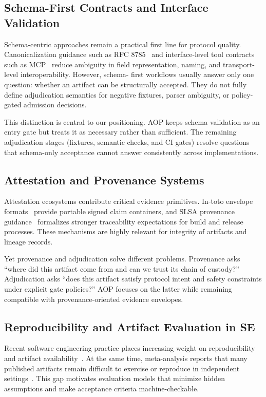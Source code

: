 \documentclass[10pt,conference]{IEEEtran}
\begin{document}
\subsection{Schema-First Contracts and Interface Validation}

Schema-centric approaches remain a practical first line for protocol quality.
Canonicalization guidance such as RFC 8785~\cite{rfc8785} and interface-level
tool contracts such as MCP~\cite{mcp_tools_20250618} reduce ambiguity in field
representation, naming, and transport-level interoperability. However, schema-
first workflows usually answer only one question: whether an artifact can be
structurally accepted. They do not fully define adjudication semantics for
negative fixtures, parser ambiguity, or policy-gated admission decisions.

This distinction is central to our positioning. AOP keeps schema validation as
an entry gate but treats it as necessary rather than sufficient. The remaining
adjudication stages (fixtures, semantic checks, and CI gates) resolve questions
that schema-only acceptance cannot answer consistently across implementations.

\subsection{Attestation and Provenance Systems}

Attestation ecosystems contribute critical evidence primitives. In-toto envelope
formats~\cite{intoto_envelope_v1} provide portable signed claim containers, and
SLSA provenance guidance~\cite{slsa_prov_v11} formalizes stronger traceability
expectations for build and release processes. These mechanisms are highly
relevant for integrity of artifacts and lineage records.

Yet provenance and adjudication solve different problems. Provenance asks
``where did this artifact come from and can we trust its chain of custody?''
Adjudication asks ``does this artifact satisfy protocol intent and safety
constraints under explicit gate policies?'' AOP focuses on the latter while
remaining compatible with provenance-oriented evidence envelopes.

\subsection{Reproducibility and Artifact Evaluation in SE}

Recent software engineering practice places increasing weight on reproducibility
and artifact availability~\cite{acm_artifact_badging_2020,
icse_open_science_2027}. At the same time, meta-analysis reports that many
published artifacts remain difficult to exercise or reproduce in independent
settings~\cite{icse_artifact_state_2026}. This gap motivates evaluation models
that minimize hidden assumptions and make acceptance criteria machine-checkable.
\end{document}
